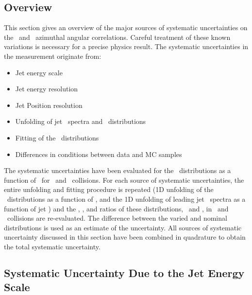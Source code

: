 \subsection{Overview}
This section gives an overview of the major sources of systematic uncertainties on the \pp\ and \pPb\ azimuthal angular correlations. Careful treatment of these known variations is necessary for a precise physics result. The systematic uncertainties in the measurement originate from:

\begin{itemize}

\item Jet energy scale

\item Jet energy resolution

\item Jet Position resolution

\item Unfolding of jet \pt\ spectra and \conetwo\ distributions

\item Fitting of the \conetwo\ distributions

\item Differences in conditions between data and MC samples

\end{itemize}

The systematic uncertainties have been evaluated for the \conetwo\ distributions as a function of \ystar\ for \pp\ and \pPb\ collisions. For each source of systematic uncertainties, the entire unfolding and fitting procedure is repeated (1D unfolding of the \conetwo\ distributions as a function of \Dphi, and the 1D unfolding of leading jet \pt\ spectra as a function of jet \pt) and the \wonetwo, \ionetwo, and ratios of these distributions, \cppb\ and \ippb, in \pPb\ and \pp\ collisions are re-evaluated. The difference between the varied and nominal distributions is used as an estimate of the uncertainty. All sources of systematic uncertainty discussed in this section have been combined in quadrature to obtain the total systematic uncertainty. 

\subsection{Systematic Uncertainty Due to the Jet Energy Scale}

